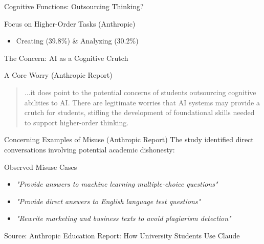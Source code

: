 \documentclass{beamer}
\begin{document}
\begin{frame}{Cognitive Functions: Outsourcing Thinking?}

\begin{block}{Focus on Higher-Order Tasks (Anthropic)}
\begin{itemize}
    \item Creating (39.8\%) & Analyzing (30.2\%)
\end{itemize}
\end{block}

\begin{figure}
    \centering
\end{figure}

\end{frame}

\begin{frame}{The Concern: AI as a Cognitive Crutch}
\begin{alertblock}{A Core Worry (Anthropic Report)}
\blockquote{...it does point to the potential concerns of students outsourcing cognitive abilities to AI. There are legitimate worries that AI systems may provide a crutch for students, stifling the development of foundational skills needed to support higher-order thinking.}
\end{alertblock}
\end{frame}

\begin{frame}{Concerning Examples of Misuse (Anthropic Report)}
The study identified direct conversations involving potential academic dishonesty:

\begin{block}{Observed Misuse Cases}
\begin{itemize}
\item \textit{"Provide answers to machine learning multiple-choice questions"}
\item \textit{"Provide direct answers to English language test questions"}
\item \textit{"Rewrite marketing and business texts to avoid plagiarism detection"}
\end{itemize}
\end{block}
\vspace{0.5cm}
\footnotesize{Source: Anthropic Education Report: How University Students Use Claude}
\end{frame}
\end{document}
